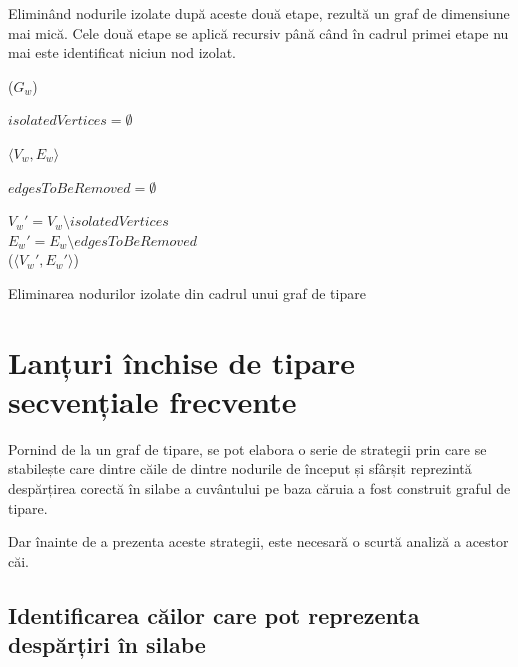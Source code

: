 Eliminând nodurile izolate după aceste două etape, rezultă un graf de dimensiune mai mică. Cele două etape se aplică recursiv până când în cadrul primei etape nu mai este identificat niciun nod izolat. 

\begin{algorithm}[H]
\SetAlgoLined
{}

\ppg($G_{w}$) \\

$isolatedVertices = \emptyset$ \\

 {
	\KwRet $\langle V_w, E_w \rangle$
}


$edgesToBeRemoved = \emptyset$ \\

$V_w' = V_w \setminus isolatedVertices$\\
$E_w' = E_w \setminus edgesToBeRemoved$\\

\KwRet \ppg($\langle V_w', E_w'  \rangle$) \\
\vspace{.1cm}

\caption{Eliminarea nodurilor izolate din cadrul unui graf de tipare}
\label{algo:prunning}
\end{algorithm}

\section{Lanțuri închise de tipare secvențiale frecvente}

Pornind de la un graf de tipare, se pot elabora o serie de strategii prin care se stabilește care dintre căile de dintre nodurile de început și sfârșit reprezintă despărțirea corectă în silabe a cuvântului pe baza căruia a fost construit graful de tipare. 

Dar înainte de  a prezenta aceste strategii, este necesară o scurtă analiză a acestor căi.
\subsection{Identificarea căilor care pot reprezenta despărțiri în silabe}

